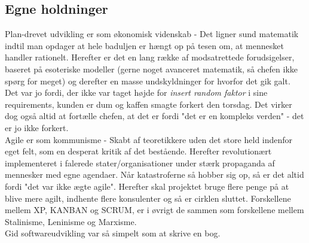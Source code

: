 \subsection{Egne holdninger}
Plan-drevet udvikling er som økonomisk videnskab - Det ligner sund matematik indtil man opdager at hele baduljen er hængt op på tesen om, at mennesket handler rationelt.
Herefter er det en lang række af modsatrettede forudsigelser, baseret på esoteriske modeller (gerne noget avanceret matematik, så chefen ikke spørg for meget) og derefter en masse undskyldninger for hvorfor det gik galt. 
Det var jo fordi, der ikke var taget højde for \textit{insert random faktor} i sine requirements, kunden er dum og kaffen smagte forkert den torsdag.
Det virker dog også altid at fortælle chefen, at det er fordi "det er en kompleks verden" - det er jo ikke forkert. 
\\
Agile er som kommunisme - Skabt af teoretikkere uden det store held indenfor eget felt, som en desperat kritik af det bestående.
Herefter revolutionært implementeret i falerede stater/organisationer under stærk propaganda af mennesker med egne agendaer. 
Når katastroferne så hobber sig op, så er det altid fordi "det var ikke ægte agile".
Herefter skal projektet bruge flere penge på at blive mere agilt, indhente flere konsulenter og så er cirklen sluttet.
Forskellene mellem XP, KANBAN og SCRUM, er i øvrigt de sammen som forskellene mellem Stalinisme, Leninisme og Marxisme. 
\\
Gid softwareudvikling var så simpelt som at skrive en bog.